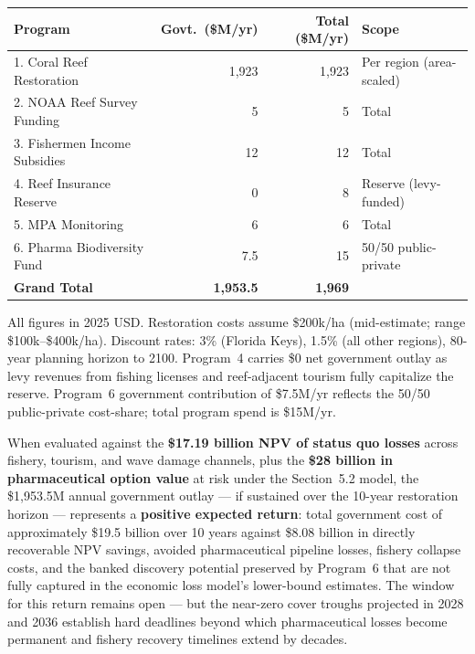 \documentclass[10pt,letterpaper]{article}
\newcounter{gs}
\begin{document}
\begin{tcolorbox}[title=Total Recommended Annual Funding Package,
  colback=gray!10, colframe=black, fonttitle=\bfseries\large, breakable]
  \begin{center}
  \begin{tabular}{lrrl}
    \toprule
    \textbf{Program} & \textbf{Govt.\ (\$M/yr)} & \textbf{Total (\$M/yr)} & \textbf{Scope} \\
    \midrule
    1. Coral Reef Restoration          & 1,923  & 1,923  & Per region (area-scaled) \\
    2. NOAA Reef Survey Funding        & 5      & 5      & Total \\
    3. Fishermen Income Subsidies      & 12     & 12     & Total \\
    4. Reef Insurance Reserve          & 0      & 8      & Reserve (levy-funded) \\
    5. MPA Monitoring                  & 6      & 6      & Total \\
    6. Pharma Biodiversity Fund        & 7.5    & 15     & 50/50 public-private \\
    \midrule
    \textbf{Grand Total}               & \textbf{1,953.5} & \textbf{1,969} & \\
    \bottomrule
  \end{tabular}
  \end{center}

  \medskip
  \noindent All figures in 2025 USD. Restoration costs assume \$200k/ha (mid-estimate; range
  \$100k--\$400k/ha). Discount rates: 3\% (Florida Keys), 1.5\% (all other regions), 80-year
  planning horizon to 2100. Program~4 carries \$0 net government outlay as levy revenues from
  fishing licenses and reef-adjacent tourism fully capitalize the reserve. Program~6 government
  contribution of \$7.5M/yr reflects the 50/50 public-private cost-share; total program spend
  is \$15M/yr.

  \medskip
  \noindent When evaluated against the \textbf{\$17.19 billion NPV of status quo losses} across
  fishery, tourism, and wave damage channels, plus the \textbf{\$28 billion in pharmaceutical
  option value} at risk under the Section~5.2 model, the \$1,953.5M annual government outlay ---
  if sustained over the 10-year restoration horizon --- represents a \textbf{positive expected
  return}: total government cost of approximately \$19.5 billion over 10 years against \$8.08
  billion in directly recoverable NPV savings, avoided pharmaceutical pipeline losses, fishery
  collapse costs, and the banked discovery potential preserved by Program~6 that are not fully
  captured in the economic loss model's lower-bound estimates. The window for this return remains
  open --- but the near-zero cover troughs projected in 2028 and 2036 establish hard deadlines
  beyond which pharmaceutical losses become permanent and fishery recovery timelines extend by
  decades.
\end{tcolorbox}
\end{document}
